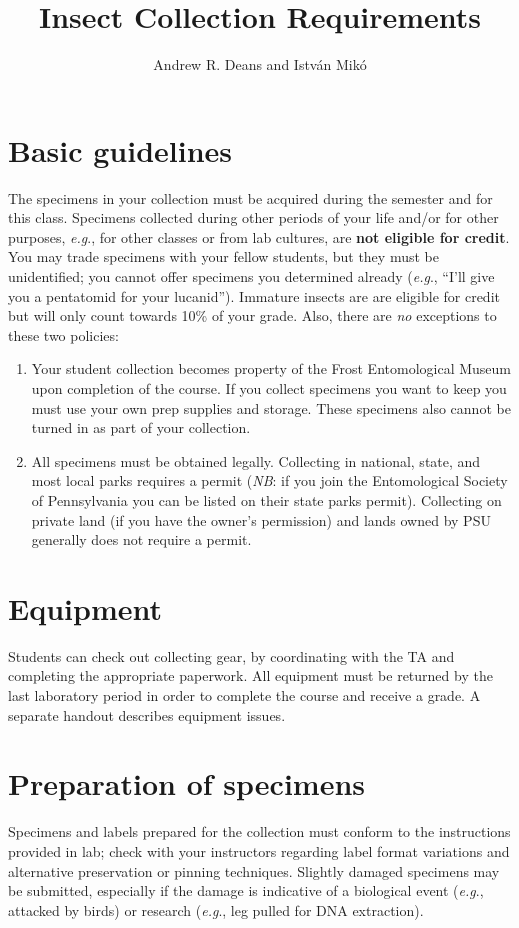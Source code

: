 \documentclass[letterpaper, 11pt]{article}
\title{Insect Collection Requirements}
\author{Andrew R. Deans and Istv\'an Mik\'o}
\begin{document}
\cleanlookdateon %
\maketitle
\thispagestyle{fancy}
\section*{Basic guidelines}
The specimens in your collection must be acquired during the semester and for this class. Specimens collected during other periods of your life and/or for other purposes, \textit{e.g}., for other classes or from lab cultures, are \textbf{not eligible for credit}. You may trade specimens with your fellow students, but they must be unidentified; you cannot offer specimens you determined already (\textit{e.g}., ``I'll give you a pentatomid for your lucanid''). Immature insects are are eligible for credit but will only count towards 10\% of your grade. Also, there are \textit{no} exceptions to these two policies: 

\begin{enumerate}
\item Your student collection becomes property of the Frost Entomological Museum upon completion of the course. If you collect specimens you want to keep you must use your own prep supplies and storage. These specimens also cannot be turned in as part of your collection.
\item All specimens must be obtained legally. Collecting in national, state, and most local parks requires a permit (\textit{NB}: if you join the Entomological Society of Pennsylvania you can be listed on their state parks permit). Collecting on private land (if you have the owner’s permission) and lands owned by PSU generally does not require a permit.
\end{enumerate}

\section*{Equipment}
Students can check out collecting gear, by coordinating with the TA and completing the appropriate paperwork. All equipment must be returned by the last laboratory period in order to complete the course and receive a grade. A separate handout describes equipment issues.

\section*{Preparation of specimens}
Specimens and labels prepared for the collection must conform to the instructions provided in lab; check with your instructors regarding label format variations and alternative preservation or pinning techniques. Slightly damaged specimens may be submitted, especially if the damage is indicative of a biological event (\textit{e.g}., attacked by birds) or research (\textit{e.g}., leg pulled for DNA extraction).
\end{document}
